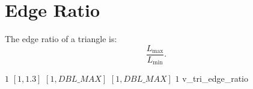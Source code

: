 \section{Edge Ratio}

The edge ratio of a triangle is: 
\[
\frac{L_{\max}}{L_{\min}}.
\]

%
{$1$}%
{$[1,1.3]$}%
{$[1,DBL\_MAX]$}%
{$[1,DBL\_MAX]$}%
{$1$}%
{\cite{pebay:03}}%
{v\_tri\_edge\_ratio}%

